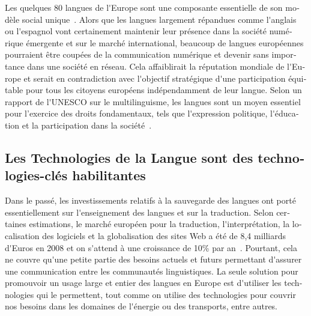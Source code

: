 \begin{french}
\begin{multicols}{2}

Les quelques 80 langues de l{\mbox '}Europe sont une composante
essentielle de son modèle social unique~\cite{EC2}. Alors que les
langues largement répandues comme l{\mbox '}anglais ou l{\mbox
 '}espagnol vont certainement maintenir leur présence dans la société
numérique émergente et sur le marché international, beaucoup de
langues européennes pourraient être coupées de la communication
numérique et devenir sans importance dans une société en réseau. Cela
affaiblirait la réputation mondiale de l{\mbox '}Europe et serait en
contradiction avec l{\mbox '}objectif stratégique d{\mbox '}une
participation équitable pour tous les citoyens européens
indépendamment de leur langue. Selon un rapport de l{\mbox '}UNESCO
sur le multilinguisme, les langues sont un moyen essentiel pour
l'exercice des droits fondamentaux, tels que l{\mbox '}expression
politique, l{\mbox '}éducation et la participation dans la
société~\cite{UNESCO2007}.

\subsection{Les Technologies de la Langue sont des technologies-clés habilitantes}

Dans le passé, les investissements relatifs à la sauvegarde des
langues ont porté essentiellement sur l{\mbox '}enseignement des
langues et sur la traduction. Selon certaines estimations, le marché
européen pour la traduction, l{\mbox '}interprétation, la localisation
des logiciels et la globalisation des sites Web a été de 8,4 milliards
d{\mbox '}Euros en 2008 et on s{\mbox '}attend à une croissance de
10\% par an~\cite{EC3}. Pourtant, cela ne couvre qu{\mbox '}une petite
partie des besoins actuels et futurs permettant d{\mbox '}assurer une
communication entre les communautés linguistiques. La seule solution
pour promouvoir un usage large et entier des langues en Europe est
d{\mbox '}utiliser les technologies qui le permettent, tout comme on
utilise des technologies pour couvrir nos besoins dans les domaines de
l{\mbox '}énergie ou des transports, entre autres.


\end{multicols}
\end{french}
